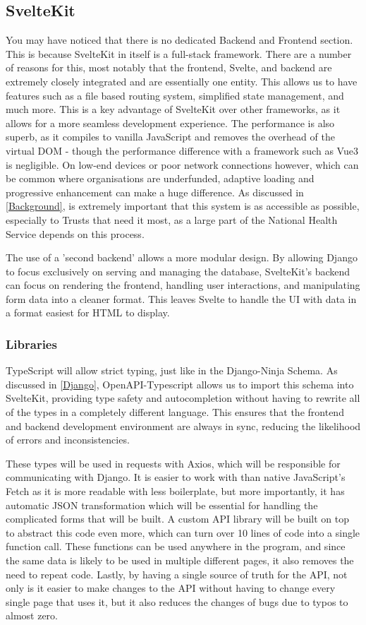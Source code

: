 \subsection{SvelteKit}
You may have noticed that there is no dedicated Backend and Frontend section. This is because SvelteKit in itself is a full-stack framework. There are a number of reasons for this, most notably that the frontend, Svelte, and backend are extremely closely integrated and are essentially one entity. This allows us to have features such as a file based routing system, simplified state management, and much more. This is a key advantage of SvelteKit over other frameworks, as it allows for a more seamless development experience. The performance is also superb, as it compiles to vanilla JavaScript and removes the overhead of the virtual DOM - though the performance difference with a framework such as Vue3 is negligible. On low-end devices or poor network connections however, which can be common where organisations are underfunded, adaptive loading and progressive enhancement can make a huge difference. As discussed in \ref{Background}, is extremely important that this system is as accessible as possible, especially to Trusts that need it most, as a large part of the National Health Service depends on this process. 

The use of a 'second backend' allows a more modular design. By allowing Django to focus exclusively on serving and managing the database, SvelteKit's backend can focus on rendering the frontend, handling user interactions, and manipulating form data into a cleaner format. This leaves Svelte to handle the UI with data in a format easiest for HTML to display. 

\subsubsection{Libraries}
TypeScript will allow strict typing, just like in the Django-Ninja Schema. As discussed in \ref{Django}, OpenAPI-Typescript allows us to import this schema into SvelteKit, providing type safety and autocompletion without having to rewrite all of the types in a completely different language. This ensures that the frontend and backend development environment are always in sync, reducing the likelihood of errors and inconsistencies. 

These types will be used in requests with Axios, which will be responsible for communicating with Django. It is easier to work with than native JavaScript's Fetch as it is more readable with less boilerplate, but more importantly, it has automatic JSON transformation which will be essential for handling the complicated forms that will be built. A custom API library will be built on top to abstract this code even more, which can turn over 10 lines of code into a single function call. These functions can be used anywhere in the program, and since the same data is likely to be used in multiple different pages, it also removes the need to repeat code. Lastly, by having a single source of truth for the API, not only is it easier to make changes to the API without having to change every single page that uses it, but it also reduces the changes of bugs due to typos to almost zero.

